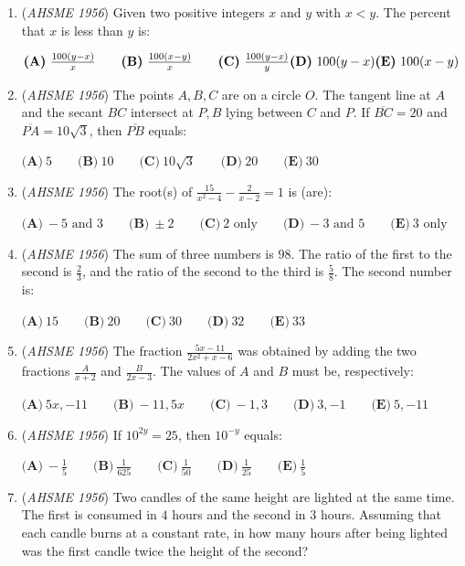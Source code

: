 \begin{enumerate}
	\item (\textit{AHSME 1956}) Given two positive integers $x$ and $y$ with $x < y$. The percent that $x$ is less than $y$ is: 


 $\textbf{(A)}\ \frac{100(y-x)}{x}\qquad \textbf{(B)}\ \frac{100(x-y)}{x}\qquad \textbf{(C)}\ \frac{100(y-x)}{y}\qquad \\ \textbf{(D)}\ 100(y-x) \textbf{(E)}\ 100(x - y)$


	\item (\textit{AHSME 1956}) The points $A,B,C$ are on a circle $O$. The tangent line at $A$ and the secant $BC$ intersect at $P, B$ lying between $C$ and $P$. 
If $\overline{BC} = 20$ and $\overline{PA} = 10\sqrt {3}$, then $\overline{PB}$ equals: 


 $\textbf{(A)}\ 5 \qquad\textbf{(B)}\ 10 \qquad\textbf{(C)}\ 10\sqrt {3} \qquad\textbf{(D)}\ 20 \qquad\textbf{(E)}\ 30$


	\item (\textit{AHSME 1956}) The root(s) of $\frac {15}{x^2 - 4} - \frac {2}{x - 2} = 1$ is (are): 


 $\textbf{(A)}\ -5\text{ and }3\qquad \textbf{(B)}\ \pm 2\qquad \textbf{(C)}\ 2\text{ only}\qquad \textbf{(D)}\ -3\text{ and }5\qquad \textbf{(E)}\ 3\text{ only}$


	\item (\textit{AHSME 1956}) The sum of three numbers is $98$. The ratio of the first to the second is $\frac {2}{3}$, 
and the ratio of the second to the third is $\frac {5}{8}$. The second number is: 


 $\textbf{(A)}\ 15 \qquad\textbf{(B)}\ 20 \qquad\textbf{(C)}\ 30 \qquad\textbf{(D)}\ 32 \qquad\textbf{(E)}\ 33$


	\item (\textit{AHSME 1956}) The fraction $\frac {5x - 11}{2x^2 + x - 6}$ was obtained by adding the two fractions $\frac {A}{x + 2}$ and 
$\frac {B}{2x - 3}$. The values of $A$ and $B$ must be, respectively: 


 $\textbf{(A)}\ 5x,-11\qquad\textbf{(B)}\ -11,5x\qquad\textbf{(C)}\ -1,3\qquad\textbf{(D)}\ 3,-1\qquad\textbf{(E)}\ 5,-11$


	\item (\textit{AHSME 1956}) If $10^{2y} = 25$, then $10^{ - y}$ equals: 


 $\textbf{(A)}\ -\frac{1}{5}\qquad \textbf{(B)}\ \frac{1}{625}\qquad \textbf{(C)}\ \frac{1}{50}\qquad \textbf{(D)}\ \frac{1}{25}\qquad \textbf{(E)}\ \frac{1}{5}$


	\item (\textit{AHSME 1956}) Two candles of the same height are lighted at the same time. The first is consumed in $4$ hours and the second in $3$ hours. 
Assuming that each candle burns at a constant rate, in how many hours after being lighted was the first candle twice the height of the second? 



\end{enumerate}
